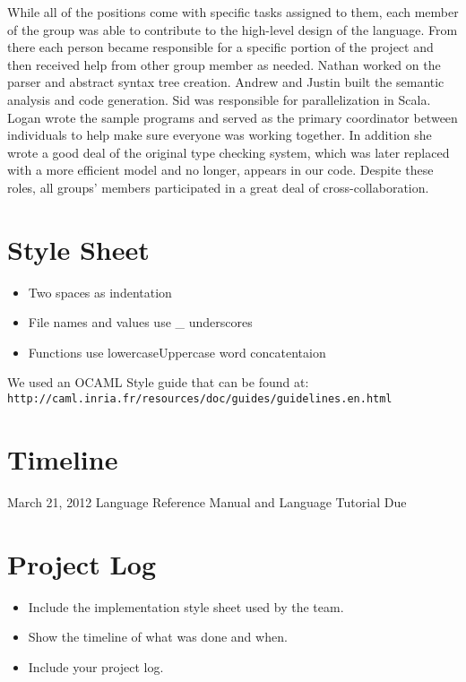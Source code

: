 While all of the positions come with specific tasks assigned to them, each member of the group was able to contribute to the high-level design of the language.  From there each person became responsible for a specific portion of the project and then received help from other group member as needed. Nathan worked on the parser and abstract syntax tree creation. Andrew and Justin built the semantic analysis and code generation. Sid was responsible for parallelization in Scala. Logan wrote the sample programs and served as the primary coordinator between individuals to help make sure everyone was working together. In addition she wrote a good deal of the original type checking system, which was later replaced with a more efficient model and no longer, appears in our code. Despite these roles, all groups' members participated in a great deal of cross-collaboration.

\section{Style Sheet}
\begin{itemize}
\item Two spaces as indentation 
\item File names and values use \_ underscores
\item Functions use lowercaseUppercase word concatentaion 
\end{itemize}

We used an OCAML Style guide that can be found at:
\verb=http://caml.inria.fr/resources/doc/guides/guidelines.en.html=

\section{Timeline}
\begin{description}
\item{March 21, 2012} Language Reference Manual and Language Tutorial Due

\end{description}
\section{Project Log}

\begin{itemize}

\item Include the implementation style sheet used by the team.
\item Show the timeline of what was done and when.
\item Include your project log.
\end{itemize}
